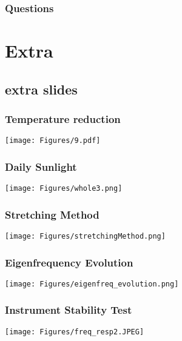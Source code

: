 \documentclass[compress=false,usepdftitle=false, subsection=false,xcolor=dvipsnames]{beamer}
\begin{document}
\begin{frame}
	\frametitle{Questions}
	\begin{center}
    \end{center}
\end{frame}
%
\section{Extra}
\subsection{extra slides}

\begin{frame}
	\frametitle{Temperature reduction}
	\begin{center}
		\texttt{[image: Figures/9.pdf]}
    \end{center}
\end{frame}

\begin{frame}
	\frametitle{Daily Sunlight}
	\begin{center}
		\texttt{[image: Figures/whole3.png]}
    \end{center}
\end{frame}

\begin{frame}
	\frametitle{Stretching Method}
	\begin{center}
		\texttt{[image: Figures/stretchingMethod.png]}
    \end{center}
\end{frame}

\begin{frame}
	\frametitle{Eigenfrequency Evolution}
	\begin{center}
		\texttt{[image: Figures/eigenfreq\_evolution.png]}
    \end{center}
\end{frame}

\begin{frame}
	\frametitle{Instrument Stability Test}
	\begin{center}
		\texttt{[image: Figures/freq\_resp2.JPEG]}
    \end{center}
\end{frame}
%
\end{document}
